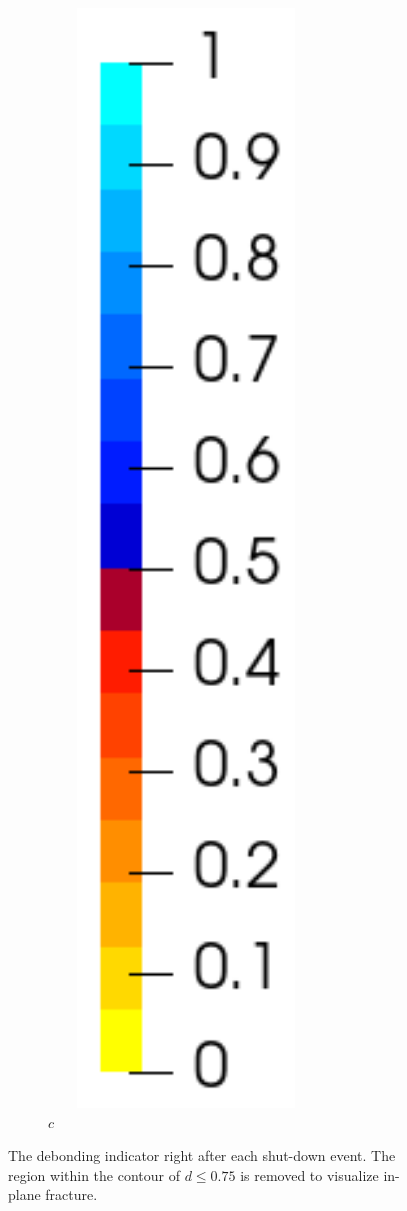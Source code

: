 \begin{figure}[!htb]
\begin{subfigure}{0.08\textwidth}
  \end{subfigure}
  \begin{subfigure}{0.1\textwidth}
    \centering
    \caption*{$c$}
    \includegraphics[width=0.8\textwidth]{Chapter5/figures/spallation/colorbar_c}
  \end{subfigure}
  \caption{The debonding indicator right after each shut-down event. The region within the contour of $d \leqslant 0.75$ is removed to visualize in-plane fracture.}
  \label{fig: Chapter5/spallation/animation_c}
\end{figure}
